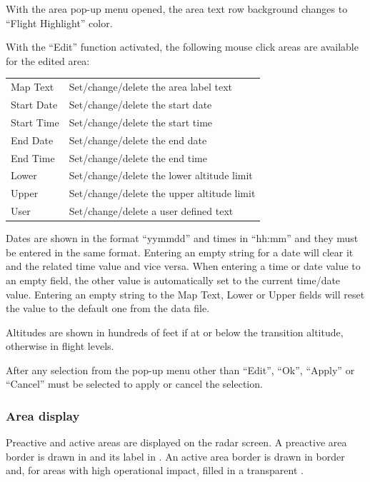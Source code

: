 \documentclass[a4paper,oneside,11pt]{memoir}
\begin{document}
With the area pop-up menu opened, the area text row background changes to “Flight Highlight” color. 

\bigskip

With the “Edit” function activated, the following mouse click areas are available for the edited area:

\begin{longtable}{p{2.5cm} p{10cm}}
  Map Text    & Set/change/delete the area label text\\
  Start Date  & Set/change/delete the start date\\
  Start Time  & Set/change/delete the start time\\
  End Date    & Set/change/delete the end date\\
  End Time    & Set/change/delete the end time\\
  Lower       & Set/change/delete the lower altitude limit\\
  Upper       & Set/change/delete the upper altitude limit\\
  User        & Set/change/delete a user defined text\\
\end{longtable}

Dates are shown in the format “yymmdd” and times in “hh:mm” and they must be entered in the same format. Entering an empty string for a date will clear it and the related time value and vice versa. When entering a time or date value to an empty field, the other value is automatically set to the current time/date value. Entering an empty string to the Map Text, Lower or Upper fields will reset the value to the default one from the data file.

\bigskip

Altitudes are shown in hundreds of feet if at or below the transition altitude, otherwise in flight levels.

\bigskip

After any selection from the pop-up menu other than “Edit”, “Ok”, “Apply” or “Cancel” must be selected to apply or cancel the selection. 

\subsubsection{Area display}

Preactive and active areas are displayed on the radar screen. A preactive area border is drawn in  and its label in . An active area border is drawn in  border and, for areas with high operational impact, filled in a transparent . 
\end{document}
